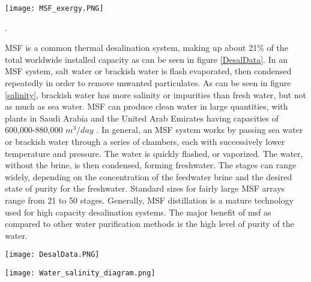 \begin{figure*}[h!]
\centering
\texttt{[image: MSF\_exergy.PNG]}
\caption{\small \sl The Multi-Stage Flash exergy analysis diagram showing where exergy is lost in the system.  This exergy diagram was published in \cite{Kahraman2005}}.
\centering
\label{MSF_x}
\end{figure*}

MSF is a common thermal desalination system, making up about 21\% of the total worldwide installed capacity as can be seen in figure \ref{DesalData}. In an MSF system, salt water or brackish water is flash evaporated, then condensed repeatedly in order to remove unwanted particulates. As can be seen in figure \ref{salinity}, brackish water has more salinity or impurities than fresh water, but not as much as sea water. MSF can produce clean water in large quantities, with plants in Saudi Arabia and the United Arab Emirates having capacities of 600,000-880,000 $m^3/day$ \cite{El-Dessouky2016}. In general, an MSF system works by passing sea water or brackish water through a series of chambers, each with successively lower temperature and pressure.  The water is quickly flashed, or vaporized.  The water, without the brine, is then condensed, forming freshwater.  The stages can range widely, depending on the concentration of the feedwater brine and the desired state of purity for the freshwater. Standard sizes for fairly large MSF arrays range from 21 to 50 stages. Generally, MSF distillation is a mature technology used for high capacity desalination systems. The major benefit of \ac{msf} as compared to other water purification methods is the high level of purity of the water.
\begin{figure*}[h!]
\centering
\label{DesalData}
\texttt{[image: DesalData.PNG]}
\caption{\small \sl This pie chart from \cite{Khamis} shows the overall total installed capacities of each of the technologies used for desalination. The six technologies shown represent Reverse Osmosis (RO), Multistage Flash (MSF), Multiple-effect distillation (MED), Electrodialysis Reversal (ED/EDR), and Nanofiltration (NF)}
\centering
\label{DesalData}
\end{figure*}



\begin{figure*}[h!]
\centering
\texttt{[image: Water\_salinity\_diagram.png]}
\caption{\small \sl This figure displays the differences between different water qualities.  The groundwater in Arizona qualifies as brackish \cite{USBureauofReclamation2006}.  This image is from \cite{Summerlin}}
\label{salinity}
\end{figure*}


